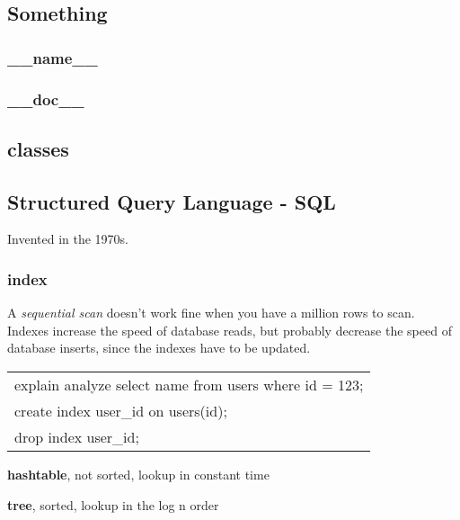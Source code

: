 \documentclass[12pt]{article}
\begin{document}



\subsection{Something}

\subsubsection{\_\_name\_\_}



\subsubsection{\_\_doc\_\_}






\subsection{classes}




\subsection{Structured Query Language - SQL}

Invented in the 1970s.



\subsubsection{index}

A \emph{sequential scan} doesn't work fine when you have a million rows to scan. Indexes increase the speed of database reads, but probably decrease the speed of database inserts, since the indexes have to be updated.

\begin{tabular}{l}
explain analyze select name from users where id = 123; \\
create index user\_id on users(id); \\
drop index user\_id;
\end{tabular}

\textbf{hashtable}, not sorted, lookup in constant time

\textbf{tree}, sorted, lookup in the log n order
\end{document}
